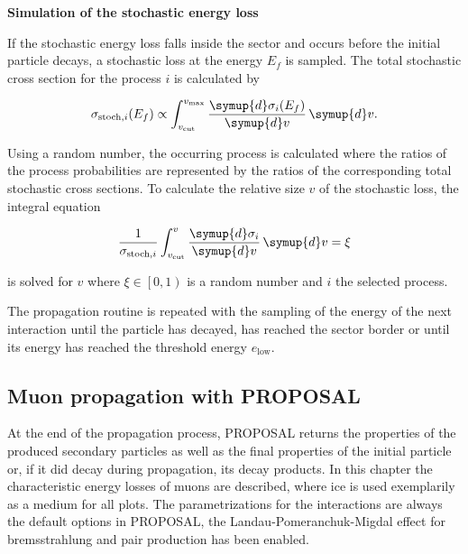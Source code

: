 \textbf{Simulation of the stochastic energy loss}

If the stochastic energy loss falls inside the sector and occurs before the initial particle decays, a stochastic loss at the energy $E_f$ is sampled.
The total stochastic cross section for the process $i$ is calculated by

\begin{equation}
	\sigma_{\text{stoch},i}(E_f) \propto \int_{v_\text{cut}}^{v_\text{max}} \frac{\symup{d}\sigma_i(E_f)}{\symup{d}v} \, \symup{d}v.
\end{equation}

Using a random number, the occurring process is calculated where the ratios of the process probabilities are represented by the ratios of the corresponding total stochastic cross sections.
To calculate the relative size $v$ of the stochastic loss, the integral equation

\begin{equation}
	\frac{1}{\sigma_{\text{stoch},i}} \int_{v_\text{cut}}^{v} \frac{\symup{d}\sigma_i}{\symup{d}v} \, \symup{d}v = \xi
\end{equation}

is solved for $v$ where $\xi \in \left[0,1\right)$ is a random number and $i$ the selected process.

The propagation routine is repeated with the sampling of the energy of the next interaction until the particle has decayed, has reached the sector border or until its energy has reached the threshold energy $e_\text{low}$.

\subsection{Muon propagation with PROPOSAL}



At the end of the propagation process, PROPOSAL returns the properties of the produced secondary particles as well as the final properties of the initial particle or, if it did decay during propagation, its decay products.
In this chapter the characteristic energy losses of muons are described, where ice is used exemplarily as a medium for all plots. The parametrizations for the interactions are always the default options in PROPOSAL, the Landau-Pomeranchuk-Migdal effect for bremsstrahlung and pair production has been enabled. 


